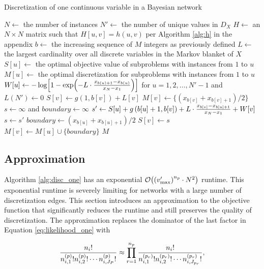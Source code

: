 \begin{algorithm}
\caption{Discretization of one continuous variable in a Bayesian network}
\label{alg:disc_one}
\begin{algorithmic}[5]
\State
\State $N \leftarrow$ the number of instances
\State $N' \leftarrow$ the number of unique values in $D_X$
\State $H \leftarrow$ an $N \times N$ matrix such that $H[u,v] = h(u,v)$ per Algorithm \ref{alg:h} in the appendix
\State $b \leftarrow$ the increasing sequence of $M$ integers as previously defined
\State $L \leftarrow$ the largest cardinality over all discrete variables in the Markov blanket of $X$
\State $S[u] \leftarrow$ the optimal objective value of subproblems with instances from $1$ to $u$
\State $M[u] \leftarrow$ the optimal discretization for subproblems with instances from $1$ to $u$
\State $W[u]  \leftarrow - \log\brock{1 - {\exp\paren{- L \cdot{ {{x_{b(u)+1} - x_{b(u)}}\over{x_N - x_1}}}}}}$ for $u = 1,2, \ldots,N'-1$ and $L(N') \leftarrow 0$
\State
{}
\State $S[v] \leftarrow g \left(1,b[v] \right) + L[v]$
\State $M[v] \leftarrow \{ ({x_{b[v]} + x_{b[v]+1}}) / 2\}$
\Else
\State $s \leftarrow \infty$ and $boundary \leftarrow \infty$
\State $s' \leftarrow S[u] + g \left( b[u]+1,b[v] \right) +  {L \cdot {{x_{b[v]} - x_{b[u] + 1}}\over{x_N - x_1}}} + W[v]$
\State $s \leftarrow s'$
\State $boundary \leftarrow ({x_{b[u]} + x_{b[u]+1}}) / 2$
\EndIf
\EndFor
\State $S[v] \leftarrow s$
\State $M[v] \leftarrow M[u] \cup \{ boundary\}$
\EndIf
\EndFor
 \State \Return $M$
\EndFunction
\end{algorithmic}
\end{algorithm}


\subsection{Approximation}

Algorithm \ref{alg:disc_one} has an exponential $\bigo\paren{\paren{v'_\text{max}}^{n_p} \cdot N^2}$ runtime.
This exponential runtime is severely limiting for networks with a large number of discretization edges.
This section introduces an approximation to the objective function that significantly reduces the runtime and still preserves the quality of discretization.
The approximation replaces the dominator of the last factor in Equation \ref{eq:likelihood_one} with

\begin{equation}
{\frac{{n_i}!}{ {n^{(p)}_{i,1} !} {n^{(p)}_{i,2} !} \cdots {n^{(p)}_{i,J_P} !}}} \approx \prod_{r=1}^{n_p} { {{{n}_i}!}\over{ {n^{(p_r)}_{i,1} !} {n^{(p_r)}_{i,2} !} \cdots {n^{(p_r)}_{i,J_{p_r}} !}}}\text{,}
\end{equation}

